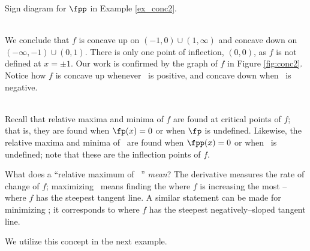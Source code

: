 {\noindent\begin{minipage}{\textwidth}\centering
{}
\captionsetup{type=figure}%
\caption{Sign diagram for $\fpp$ in Example \ref{ex_conc2}.}\label{fig:concline2}
\end{minipage}\\

We conclude that $f$ is concave up on $(-1,0)\cup(1,\infty)$ and concave down on $(-\infty,-1)\cup(0,1)$. There is only one point of inflection, $(0,0)$, as $f$ is not defined at $x=\pm 1$. Our work is confirmed by the graph of $f$ in Figure \ref{fig:conc2}. Notice how $f$ is concave up whenever \fpp\ is positive, and concave down when \fpp\ is negative.
}\\

Recall that relative maxima and minima of $f$ are found at critical points of $f$; that is, they are found when $\fp(x)=0$ or when $\fp$ is undefined. Likewise, the relative maxima and minima of \fp\ are found when $\fpp(x)=0$ or when \fpp\ is undefined; note that these are the inflection points of $f$. 

What does a ``relative maximum of \fp\ '' \textit{mean}? The derivative measures the rate of change of $f$; maximizing \fp\ means finding the where $f$ is increasing the most -- where $f$ has the steepest tangent line. A similar statement can be made for minimizing \fp; it corresponds to where $f$ has the steepest negatively--sloped tangent line.

We utilize this concept in the next example.\\

\enlargethispage{\baselineskip}

